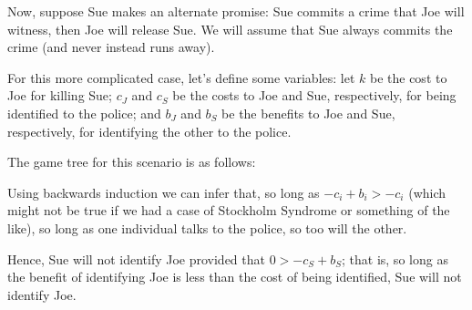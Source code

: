 \documentclass{article}
\begin{document}
Now, suppose Sue makes an alternate promise: Sue commits a crime that
Joe will witness, then Joe will release Sue. We will assume that Sue
always commits the crime (and never instead runs away).

For this more complicated case, let's define some variables: let $k$ be
the cost to Joe for killing Sue; $c_J$ and $c_S$ be the costs to Joe and
Sue, respectively, for being identified to the police; and $b_J$ and
$b_S$ be the benefits to Joe and Sue, respectively, for identifying the
other to the police.

The game tree for this scenario is as follows:

\begin{center}
\end{center}

Using backwards induction we can infer that, so long as $-c_i + b_i >
-c_i$ (which might not be true if we had a case of Stockholm Syndrome or
something of the like), so long as one individual talks to the police,
so too will the other.

Hence, Sue will not identify Joe provided that $0 > -c_S + b_S$; that
is, so long as the benefit of identifying Joe is less than the cost of
being identified, Sue will not identify Joe.
\end{document}
